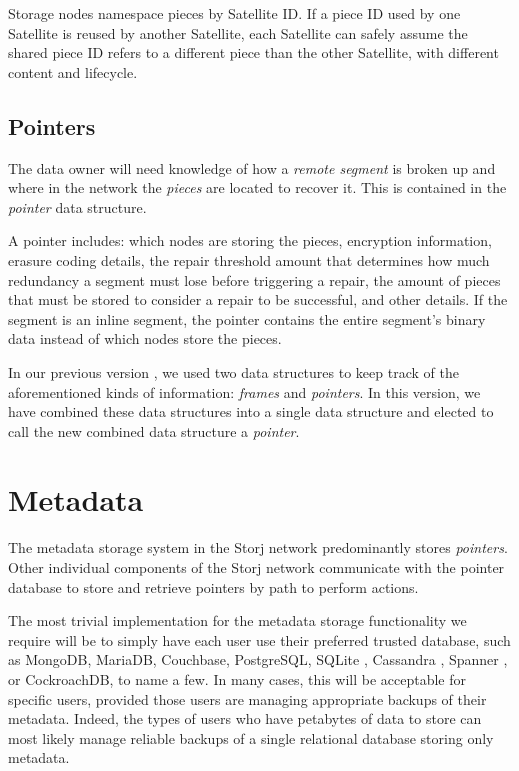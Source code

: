 \documentclass[8pt,fleqn,openany]{book}
\begin{document}
Storage nodes namespace pieces by Satellite ID. If a piece ID used by one
Satellite is reused by another Satellite, each Satellite can safely assume the shared piece ID refers
to a different piece than the other Satellite, with different content and lifecycle.

\subsection{Pointers}

The data owner will need knowledge of how a {\em remote segment} is broken up and
where in the network the {\em pieces} are located to recover it. This is contained
in the {\em pointer} data structure.

A pointer includes: which nodes are storing the pieces,
encryption information, erasure coding details,
the repair threshold amount that determines how much redundancy a segment
must lose before triggering a repair, the amount of pieces that must be
stored to consider a repair to be successful, and other details. If the
segment is an inline segment, the pointer contains the entire segment's binary
data instead of which nodes store the pieces.

In our previous version \cite{storj-v2}, we used two data structures to keep
track of the aforementioned kinds of information:
{\em frames} and {\em pointers}.
In this version, we have combined these data structures into a single data
structure and elected to call the new combined data structure a {\em pointer}.

\section{Metadata}\label{sec:concrete-metadata}

The metadata storage system in the Storj network predominantly stores
{\em pointers}. Other individual components of the Storj network communicate with
the pointer database to store and retrieve pointers by path to perform actions.

The most trivial implementation for the metadata storage functionality we
require will be to simply have each user use their preferred trusted database,
such as MongoDB, MariaDB, Couchbase, PostgreSQL, SQLite \cite{sqlite},
Cassandra \cite{cassandra}, Spanner \cite{spanner}, or CockroachDB,
to name a few. In many cases, this will
be acceptable for specific users, provided those users are managing appropriate
backups of their metadata. Indeed, the types of users who have petabytes of data
to store can most likely manage reliable backups of a single relational database
storing only metadata.
\end{document}
